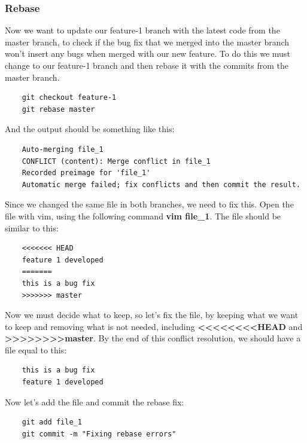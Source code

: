 \documentclass{article}
\begin{document}
\subsubsection{Rebase}

Now we want to update our feature-1 branch with the latest code from the master branch, to check if the bug fix that we merged into the master branch won't insert any bugs when merged with our new feature. To do this we must change to our feature-1 branch and then rebase it with the commits from the master branch.

\begin{lstlisting}
	git checkout feature-1
	git rebase master
\end{lstlisting}

And the output should be something like this:

\begin{lstlisting}
	Auto-merging file_1
	CONFLICT (content): Merge conflict in file_1
	Recorded preimage for 'file_1'
	Automatic merge failed; fix conflicts and then commit the result.
\end{lstlisting}

Since we changed the same file in both branches, we need to fix this. Open the file with vim, using the following command \textbf{vim file\_1}. The file should be similar to this:

\begin{lstlisting}
	<<<<<<< HEAD
	feature 1 developed
	=======
	this is a bug fix
	>>>>>>> master
\end{lstlisting}

Now we must decide what to keep, so let's fix the file, by keeping what we want to keep and removing what is not needed, including \textbf{\textless\textless\textless\textless\textless\textless\textless\textless HEAD} and \textbf{\textgreater\textgreater\textgreater\textgreater\textgreater\textgreater\textgreater\textgreater master}. By the end of this conflict resolution, we should have a file equal to this:

\begin{lstlisting}
	this is a bug fix
	feature 1 developed
\end{lstlisting}

Now let's add the file and commit the rebase fix:

\begin{lstlisting}
	git add file_1
	git commit -m "Fixing rebase errors"
\end{lstlisting}
\end{document}
